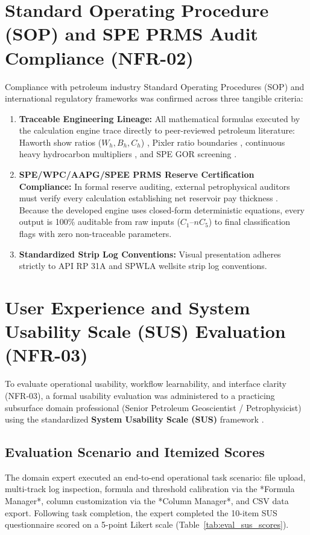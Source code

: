 \section{Standard Operating Procedure (SOP) and SPE PRMS Audit Compliance (NFR-02)}

Compliance with petroleum industry Standard Operating Procedures (SOP) and international regulatory frameworks was confirmed across three tangible criteria:
\begin{enumerate}
    \item \textbf{Traceable Engineering Lineage:} All mathematical formulas executed by the calculation engine trace directly to peer-reviewed petroleum literature: Haworth show ratios ($W_h, B_h, C_h$) \citep{haworth1985}, Pixler ratio boundaries \citep{ref13}, continuous heavy hydrocarbon multipliers \citep{whittaker1991}, and SPE GOR screening \citep{spe2020}.
    \item \textbf{SPE/WPC/AAPG/SPEE PRMS Reserve Certification Compliance:} In formal reserve auditing, external petrophysical auditors must verify every calculation establishing net reservoir pay thickness \citep{ref2, ref3}. Because the developed engine uses closed-form deterministic equations, every output is 100\% auditable from raw inputs ($C_1$--$nC_5$) to final classification flags with zero non-traceable parameters.
    \item \textbf{Standardized Strip Log Conventions:} Visual presentation adheres strictly to API RP 31A and SPWLA wellsite strip log conventions.
\end{enumerate}

\section{User Experience and System Usability Scale (SUS) Evaluation (NFR-03)}

To evaluate operational usability, workflow learnability, and interface clarity (NFR-03), a formal usability evaluation was administered to a practicing subsurface domain professional (Senior Petroleum Geoscientist / Petrophysicist) using the standardized \textbf{System Usability Scale (SUS)} framework \citep{brooke1996, bangor2008}.

\subsection{Evaluation Scenario and Itemized Scores}
The domain expert executed an end-to-end operational task scenario: file upload, multi-track log inspection, formula and threshold calibration via the *Formula Manager*, column customization via the *Column Manager*, and CSV data export. Following task completion, the expert completed the 10-item SUS questionnaire scored on a 5-point Likert scale (Table~\ref{tab:eval_sus_scores}).

